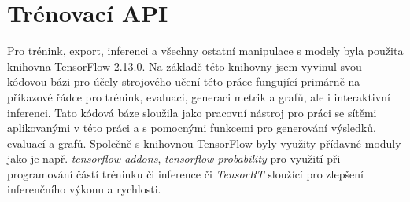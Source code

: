 \section{Trénovací API}
\label{sec:Chapter52}
Pro trénink, export, inferenci a všechny ostatní manipulace s modely byla použita knihovna TensorFlow 2.13.0. Na základě této knihovny jsem vyvinul svou kódovou bázi pro účely strojového učení této práce fungující primárně na příkazové řádce pro trénink, evaluaci, generaci metrik a grafů, ale i interaktivní inferenci. Tato kódová báze sloužila jako pracovní nástroj pro práci se sítěmi aplikovanými v této práci a s pomocnými funkcemi pro generování výsledků, evaluací a grafů. Společně s knihovnou TensorFlow byly využity přídavné moduly jako je např. \textit{tensorflow-addons}, \textit{tensorflow-probability} \cite{tensorflow_libs} pro využití při programování částí tréninku či inference či \textit{TensorRT} \cite{tensorrt_docs} sloužící pro zlepšení inferenčního výkonu a rychlosti.
\endinput